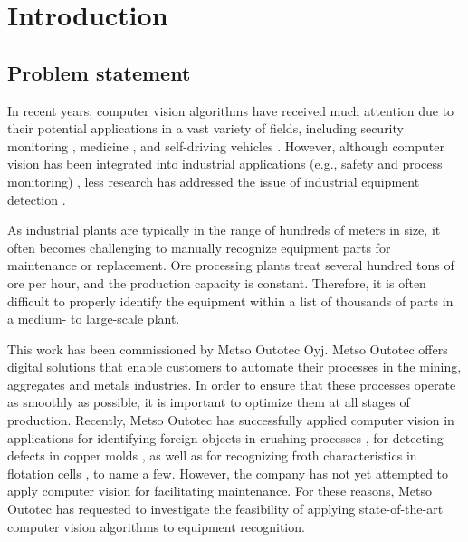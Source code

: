 \section{Introduction}

\thispagestyle{empty}
\subsection{Problem statement}
In recent years, computer vision algorithms have received much attention due to their potential applications in a vast variety of fields, including security monitoring \cite{Awalgaonkar2020}, medicine \cite{9689485}, and self-driving vehicles \cite{Janai2017, Shan2018}. However, although computer vision has been integrated into industrial applications (e.g., safety and process monitoring) \cite{Awalgaonkar2020, Banf2022}, less research has addressed the issue of industrial equipment detection \cite{Wu2022, MALBURG2021581, Kim2020}. 

As industrial plants are typically in the range of hundreds of meters in size, it often becomes challenging to manually recognize equipment parts for maintenance or replacement. Ore processing plants treat several hundred tons of ore per hour, and the production capacity is constant. Therefore, it is often difficult to properly identify the equipment within a list of thousands of parts in a medium- to large-scale plant.

This work has been commissioned by Metso Outotec Oyj.  Metso Outotec offers digital solutions that enable customers to automate their processes in the mining, aggregates and metals industries. In order to ensure that these processes operate as smoothly as possible, it is important to optimize them at all stages of production. Recently, Metso Outotec has successfully applied computer vision in applications for identifying foreign objects in crushing processes \cite{metso_outotec_2022}, for detecting defects in copper  molds \cite{metso_outotec_2022_2}, as well as for recognizing froth characteristics in flotation cells \cite{metso_outotec_2022_1}, to name a few. However, the company has not yet attempted to apply computer vision for facilitating maintenance. For these reasons, Metso Outotec has requested to investigate the feasibility of applying state-of-the-art computer vision algorithms to equipment recognition. 

